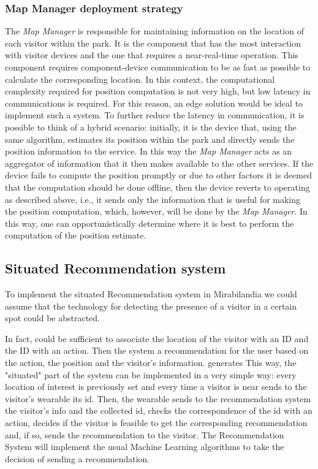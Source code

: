 \subsubsection{Map Manager deployment strategy}
The \textit{Map Manager} is responsible for maintaining information on the location of each visitor within the park. It is the component that has the
most interaction with visitor devices and the one that requires a near-real-time operation. This component requires component-device communication to
be as fast as possible to calculate the corresponding location. In this context, the computational complexity required for position computation is
not very high, but low latency in communications is required. For this reason, an edge solution would be ideal to implement such a system. To further
reduce the latency in communication, it is possible to think of a hybrid scenario: initially, it is the device that, using the same algorithm,
estimates its position within the park and directly sends the position information to the service. In this way the \textit{Map Manager} acts as an
aggregator of information that it then makes available to the other services. If the device fails to compute the position promptly or due to other
factors it is deemed that the computation should be done offline, then the device reverts to operating as described above, i.e., it sends only the
information that is useful for making the position computation, which, however, will be done by the \textit{Map Manager}. In this way, one can
opportunistically determine where it is best to perform the computation of the position estimate.


\subsection{Situated Recommendation system}
To implement the situated Recommendation system in Mirabilandia we could assume that the technology for detecting the presence of a visitor in a certain spot could be abstracted.

In fact, could be sufficient to associate the location of the visitor with an ID and the ID with an action. Then the system  a recommendation for the user based on the action, the position and the visitor's information.
generates
This way, the "situated" part of the system can be implemented in a very simple way:
every location of interest is previously set and every time a visitor is near sends to the visitor's wearable its id.
Then, the wearable sends to the recommendation system the visitor's info and the collected id, checks the correspondence of the id with an action, decides if the visitor is feasible to get the corresponding recommendation and, if so, sends the recommendation to the visitor.
The Recommendation System will implement the usual Machine Learning algorithms to take the decision of sending a recommendation.

